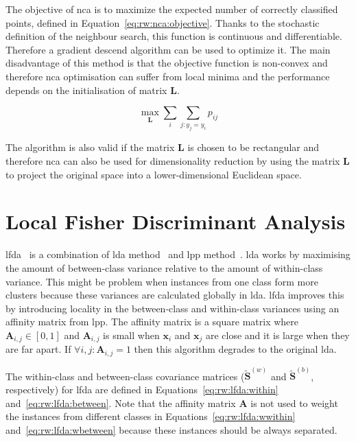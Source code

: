 \documentclass[12pt,a4paper]{report}
\begin{document}
The objective of \ac{nca} is to maximize the expected number of correctly classified points, defined in Equation~\ref{eq:rw:nca:objective}. Thanks to the stochastic definition of the neighbour search, this function is continuous and differentiable. Therefore a gradient descend algorithm can be used to optimize it. The main disadvantage of this method is that the objective function is non-convex and therefore \ac{nca} optimisation can suffer from local minima and the performance depends on the initialisation of matrix $\bm{L}$. 

\begin{equation}
\max_{\bm{L}} \sum_i \sum_{j:y_j=y_i} p_{ij} \label{eq:rw:nca:objective}
\end{equation}

The algorithm is also valid if the matrix $\bm{L}$ is chosen to be rectangular and therefore \ac{nca} can also be used for dimensionality reduction by using the matrix $\bm{L}$ to project the original space into a lower-dimensional Euclidean space.

\section{Local Fisher Discriminant Analysis} \label{chap:rw:lfda}
\acf{lfda}~\citep{sugiyama2007dimensionality} is a combination of \acf{lda} method~\citep{fisher1936use} and \acf{lpp} method~\citep{he2003locality}. \ac{lda} works by maximising the amount of between-class variance relative to the amount of within-class variance. This might be problem when instances from one class form more clusters because these variances are calculated globally in \ac{lda}. \ac{lfda} improves this by introducing locality in the between-class and within-class variances using an affinity matrix from \ac{lpp}. The affinity matrix is a square matrix where $\bm{A}_{i,j} \in [0,1]$ and $\bm{A}_{i,j}$ is small when $\bm{x}_i$ and $\bm{x}_j$ are close and it is large when they are far apart. If $\forall i,j: \bm{A}_{i,j}=1$ then this algorithm degrades to the original \ac{lda}.

The within-class and between-class covariance matrices ($\widetilde{\bm{S}}^{(w)}$ and $\widetilde{\bm{S}}^{(b)}$, respectively) for \ac{lfda} are defined in Equations~\ref{eq:rw:lfda:within} and~\ref{eq:rw:lfda:between}. Note that the affinity matrix $\bm{A}$ is not used to weight the instances from different classes in Equations~\ref{eq:rw:lfda:wwithin} and~\ref{eq:rw:lfda:wbetween} because these instances should be always separated.
\end{document}
